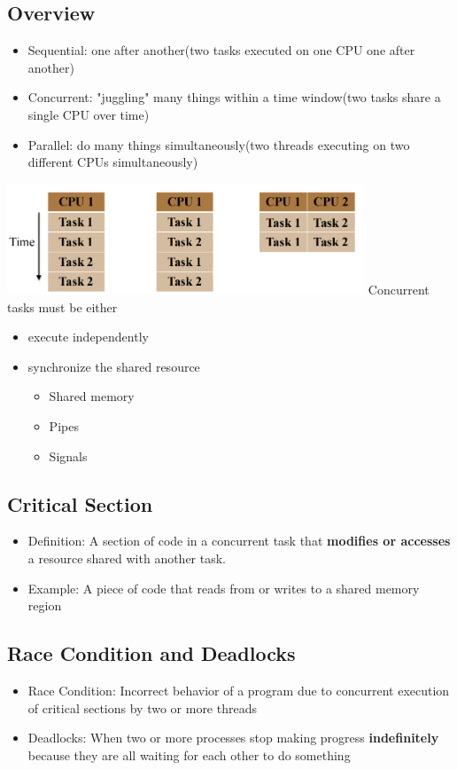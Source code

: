 \documentclass[12pt]{article}
\begin{document}
\subsection{Overview}
\begin{itemize}
    \item Sequential: one after another(two tasks executed on one CPU one after another)
    \item Concurrent: "juggling" many things within a time window(two tasks share a single CPU over time)
    \item Parallel: do many things simultaneously(two threads executing on two different CPUs simultaneously)
\end{itemize}
\includegraphics[width=0.8\textwidth]{ConcurrencyOverview.png}
\newline
Concurrent tasks must be either
\begin{itemize}
    \item execute independently
    \item synchronize the shared resource \begin{itemize}
        \item Shared memory
        \item Pipes
        \item Signals
    \end{itemize}
\end{itemize}
\subsection{Critical Section}
\begin{itemize}
    \item Definition: A section of code in a concurrent task that {\bfseries modifies or accesses} a resource shared with another task.
    \item Example: A piece of code that reads from or writes to a shared memory region
\end{itemize}
\subsection{Race Condition and Deadlocks}
\begin{itemize}
    \item Race Condition: Incorrect behavior of a program due to concurrent execution of critical sections by two or more threads
    \item Deadlocks: When two or more processes stop making progress {\bfseries indefinitely} because they are all waiting for each other to do something
\end{itemize}
\end{document}
